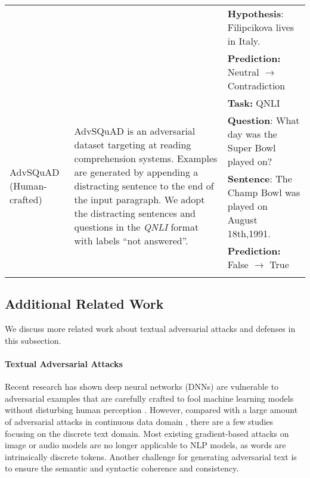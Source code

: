 \documentclass{article}
\begin{document}
\begin{table}[htp!]
{\begin{tabular}{p{2.0cm}p{6cm}p{7cm}}
 & & \textbf{Hypothesis}: Filipcikova lives in Italy. \\
 & & \textbf{Prediction:} Neutral $\rightarrow$ Contradiction \\
  \midrule
 \multirow{6}{2.0cm}{AdvSQuAD (Human-crafted)} & \multirow{6}{6cm}{AdvSQuAD is an adversarial dataset targeting at reading comprehension systems. Examples are generated by appending a distracting sentence to the end of the input paragraph. We adopt the distracting sentences and questions in the \textit{QNLI} format with labels ``not answered''.} & \textbf{Task:} QNLI \\
 & & \textbf{Question}: What day was the Super Bowl played on?  \\
 & & \textbf{Sentence}: The Champ Bowl was played on August 18th,1991. \\
 & & \textbf{Prediction:} False $\rightarrow$ True \\
 & & \\
\bottomrule
\end{tabular}
}
\end{table}

\subsection{Additional Related Work}

We discuss more related work about textual adversarial attacks and defenses in this subsection.

\paragraph{Textual Adversarial Attacks}
Recent research has shown deep neural networks (DNNs) are vulnerable to adversarial examples that are carefully crafted to fool machine learning models without disturbing human perception  \citep{Goodfellow2015ExplainingAH,Papernot2016DistillationAA,MoosaviDezfooli2016DeepFoolAS}. However, compared with a large amount of adversarial attacks in continuous data domain \citep{Yang2018CharacterizingAA,Carlini2018AudioAE,Eykholt2017RobustPA}, there are a few studies focusing on the discrete text domain. Most existing gradient-based attacks on image or audio models are no longer applicable to NLP models, as words are intrinsically discrete tokens. Another challenge for generating adversarial text is to ensure the semantic and syntactic coherence and consistency. 
\end{document}
